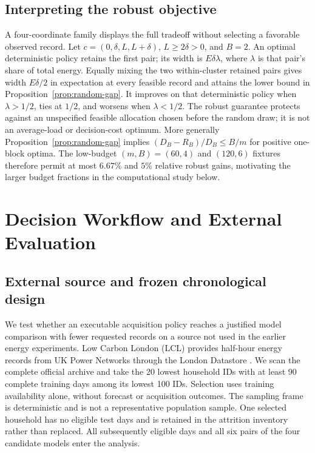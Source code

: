 \documentclass[12pt]{article}
\begin{document}
\subsection{Interpreting the robust objective}
A four-coordinate family displays the full tradeoff without selecting a
favorable observed record. Let $c=(0,\delta,L,L+\delta)$, $L\geq2\delta>0$,
and $B=2$. An optimal deterministic policy retains the first pair; its width
is $E\delta\lambda$, where $\lambda$ is that pair's share of total energy.
Equally mixing the two within-cluster retained pairs gives width
$E\delta/2$ in expectation at every feasible record and attains the lower
bound in Proposition~\ref{prop:random-gap}. It improves on that deterministic
policy when $\lambda>1/2$, ties at $1/2$, and worsens when $\lambda<1/2$.
The robust guarantee protects against an unspecified feasible allocation
chosen before the random draw; it is not an average-load or decision-cost
optimum. More generally Proposition~\ref{prop:random-gap} implies
$(D_B-R_B)/D_B\leq B/m$ for positive one-block optima. The low-budget
$(m,B)=(60,4)$ and $(120,6)$ fixtures therefore permit at most $6.67\%$
and $5\%$ relative robust gains, motivating the larger budget fractions in
the computational study below.

\section{Decision Workflow and External Evaluation}
\label{sec:external-evaluation}
\subsection{External source and frozen chronological design}\label{sec:external-design}
We test whether an executable acquisition policy reaches a justified model
comparison with fewer requested records on a source not used in the earlier
energy experiments. Low Carbon London (LCL) provides half-hour energy records
from UK Power Networks through the London Datastore \cite{lcl}. We scan the
complete official archive and take the 20 lowest household IDs with at least
90 complete training days among its lowest 100 IDs. Selection uses training
availability alone, without forecast or acquisition outcomes. The sampling
frame is deterministic and is not a representative population sample.
One selected household has no eligible test days and is retained in the
attrition inventory rather than replaced. All subsequently eligible days
and all six pairs of the four candidate models enter the analysis.
\end{document}
